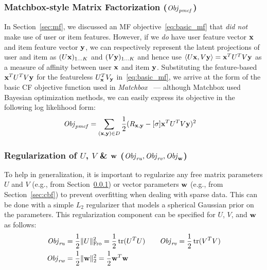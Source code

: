 \subsubsection{Matchbox-style Matrix Factorization ($\mathit{Obj}_{\mathit{pmcf}}$)}

\label{sec:matchbox_def}

In Section~\ref{sec:mf}, we discussed an MF objective~\eqref{eq:basic_mf}
that \emph{did not} make use of user or item features.  
However, if we \emph{do} have user feature vector $\mathbf{x}$ 
and item feature vector $\mathbf{y}$, we can respectively
represent the latent projections of user and item as $(U \mathbf{x})_{1 \ldots
K}$ and $(V \mathbf{y})_{1 \ldots K}$ and hence use $\langle U \mathbf{x}, V \mathbf{y} \rangle = \mathbf{x}^T
U^T V \mathbf{y}$ as a measure of affinity between user $\mathbf{x}$ and item $\mathbf{y}$.
Substituting the feature-based $\mathbf{x}^T U^T V \mathbf{y}$ for the featureless 
$U_{\mathbf{x}}^T V_{\mathbf{y}}$ in~\eqref{eq:basic_mf}, we arrive at the form of the basic CF 
objective function used in \emph{Matchbox}~\cite{matchbox} --- although
Matchbox used Bayesian optimization methods, we can easily express
its objective in the following log likelihood form:
\begin{align}
\mathit{Obj}_{\mathit{pmcf}} & = \sum_{(\mathbf{x},\mathbf{y}) \in D} \frac{1}{2} (R_{\mathbf{x},\mathbf{y}} - [\sigma] \mathbf{x}^T U^T V \mathbf{y})^2 \label{eq:matchbox_obj}
\end{align}

\subsubsection{Regularization of $U$, $V$ \& $\mathbf{w}$ ($\mathit{Obj}_{\mathit{ru}}, \mathit{Obj}_{\mathit{rv}}, \mathit{Obj}_{\mathbf{w}}$)}
%
To help in generalization, it is important to regularize any free
matrix parameters $U$ and $V$ (e.g., from
Section~\ref{sec:matchbox_def}) or vector parameters $\mathbf{w}$ (e.g., from
Section~\ref{sec:cbf}) to prevent overfitting  
when dealing with 
sparse data. This can be done with a simple $L_2$ regularizer that
models a spherical Gaussian prior %
on the parameters.  This
regularization component can be specified for $U$, $V$, and $\mathbf{w}$ 
 as follows:
\begin{align}
\mathit{Obj}_{\mathit{ru}} & = \frac{1}{2} \| U \|_{\mathrm{Fro}}^2 = \frac{1}{2} \operatorname{tr}(U^T U) \qquad
\mathit{Obj}_{\mathit{rv}} = \frac{1}{2} \operatorname{tr}(V^T V) \nonumber \\
\mathit{Obj}_{\mathit{rw}} & = \frac{1}{2} \| \mathbf{w} \|_2^2 = \frac{1}{2} \mathbf{w}^T \mathbf{w} \label{eq:reg}
\end{align}

